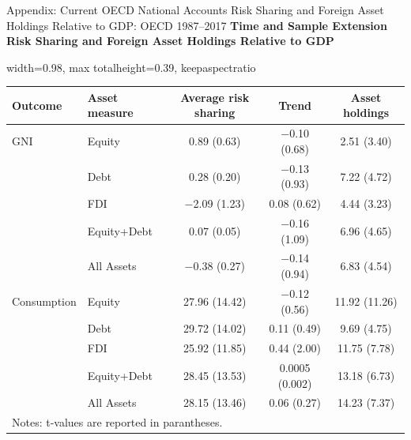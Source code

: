\documentclass[aspectratio=169, 10pt]{beamer}
\begin{document}
\begin{frame}[label=appendix:oecd2005_assets]{Appendix: Current OECD National Accounts Risk Sharing and Foreign Asset Holdings Relative to GDP: OECD 1987--2017}
  {\scriptsize \textbf{Time and Sample Extension Risk Sharing and Foreign Asset Holdings Relative to GDP}}
  
  \vspace{0.04cm}
  
  \begin{adjustbox}{
    width=0.98\textwidth,
    max totalheight=0.39\textheight,
    keepaspectratio
  }
  \begin{tabular}{llccc}
  \hline\hline
  Outcome & Asset measure & Average risk sharing & Trend & Asset holdings \\
  \hline
  GNI         & Equity       & 0.89 (0.63)    & $-$0.10 (0.68) & 2.51 (3.40)  \\
  & Debt         & 0.28 (0.20)    & $-$0.13 (0.93) & 7.22 (4.72)  \\
  & FDI          & $-$2.09 (1.23) & 0.08 (0.62)    & 4.44 (3.23)  \\
  & Equity+Debt  & 0.07 (0.05)    & $-$0.16 (1.09) & 6.96 (4.65)  \\
  & All Assets   & $-$0.38 (0.27) & $-$0.14 (0.94) & 6.83 (4.54)  \\
  \hline
  Consumption & Equity       & 27.96 (14.42)  & $-$0.12 (0.56) & 11.92 (11.26)\\
  & Debt         & 29.72 (14.02)  & 0.11 (0.49)    & 9.69 (4.75)  \\
  & FDI          & 25.92 (11.85)  & 0.44 (2.00)    & 11.75 (7.78) \\
  & Equity+Debt  & 28.45 (13.53)  & 0.0005 (0.002) & 13.18 (6.73) \\
  & All Assets   & 28.15 (13.46)  & 0.06 (0.27)    & 14.23 (7.37) \\
  \hline\hline
  \multicolumn{5}{l}{\footnotesize Notes: t-values are reported in parantheses.} \\
  \end{tabular}
  \end{adjustbox}
  
  \endgroup
  
  \end{frame}
\end{document}
